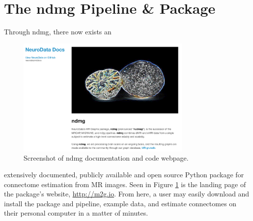 \section{The ndmg Pipeline \& Package}
\label{sec:resultndmg}
Through ndmg, there now exists an
\begin{figure}[h!]
\centering
\includegraphics[width=0.76\textwidth]{./figs/website.png}
\makeatletter
\let\@currsize\normalsize
\caption{Screenshot of ndmg documentation and code webpage.}
\label{fig:website}
\end{figure}
extensively documented, publicly available and open source Python package for connectome estimation from MR images. Seen in Figure \ref{fig:website} is the landing page of the package's website, \url{http://m2g.io}. From here, a user may easily download and install the package and pipeline, example data, and estimate connectomes on their personal computer in a matter of minutes.

